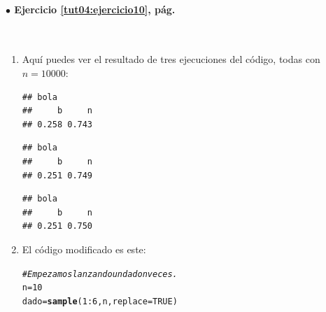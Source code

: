 \documentclass[10pt,a4paper]{article}\usepackage[]{graphicx}\usepackage[]{color}
\makeatletter
\newcommand{\hlnum}[1]{\textcolor[rgb]{0.686,0.059,0.569}{#1}}%
\newcommand{\hlcom}[1]{\textcolor[rgb]{0.678,0.584,0.686}{\textit{#1}}}%
\newcommand{\hlopt}[1]{\textcolor[rgb]{0,0,0}{#1}}%
\newcommand{\hlstd}[1]{\textcolor[rgb]{0.345,0.345,0.345}{#1}}%
\newcommand{\hlkwb}[1]{\textcolor[rgb]{0.69,0.353,0.396}{#1}}%
\newcommand{\hlkwc}[1]{\textcolor[rgb]{0.333,0.667,0.333}{#1}}%
\newcommand{\hlkwd}[1]{\textcolor[rgb]{0.737,0.353,0.396}{\textbf{#1}}}%
\newenvironment{kframe}{%
 \def\at@end@of@kframe{}%
 \ifinner\ifhmode%
  \def\at@end@of@kframe{\end{minipage}}%
  \begin{minipage}{\columnwidth}%
 \fi\fi%
 \def\FrameCommand##1{\hskip\@totalleftmargin \hskip-\fboxsep
 \colorbox{shadecolor}{##1}\hskip-\fboxsep
     \hskip-\linewidth \hskip-\@totalleftmargin \hskip\columnwidth}%
 \MakeFramed {\advance\hsize-\width
   \@totalleftmargin\z@ \linewidth\hsize
   \@setminipage}}%
 {\par\unskip\endMakeFramed%
 \at@end@of@kframe}
\newenvironment{knitrout}{}{} %
\makeatother
\begin{document}
\paragraph{\bf $\bullet$ Ejercicio \ref{tut04:ejercicio10}, pág. \pageref{tut04:ejercicio10}}
\label{tut04:ejercicio10:sol}\quad\\

\begin{enumerate}
  \item Aquí puedes ver el resultado de tres ejecuciones del código, todas con $n=10000$:
\begin{knitrout}
\color{fgcolor}\begin{kframe}
\begin{verbatim}
## bola
##     b     n 
## 0.258 0.743
\end{verbatim}
\end{kframe}
\end{knitrout}
\begin{knitrout}
\color{fgcolor}\begin{kframe}
\begin{verbatim}
## bola
##     b     n 
## 0.251 0.749
\end{verbatim}
\end{kframe}
\end{knitrout}
\begin{knitrout}
\color{fgcolor}\begin{kframe}
\begin{verbatim}
## bola
##     b     n 
## 0.251 0.750
\end{verbatim}
\end{kframe}
\end{knitrout}

      \item El código modificado es este:
\begin{knitrout}
\color{fgcolor}\begin{kframe}
\begin{alltt}
\hlcom{# Empezamos lanzando un dado n veces.}
\hlstd{n} \hlkwb{=} \hlnum{10}
\hlstd{dado} \hlkwb{=} \hlkwd{sample}\hlstd{(}\hlnum{1}\hlopt{:}\hlnum{6}\hlstd{, n,} \hlkwc{replace}\hlstd{=}\hlnum{TRUE}\hlstd{)}


\end{alltt}
\end{kframe}
\end{knitrout}
\end{enumerate}
\end{document}
